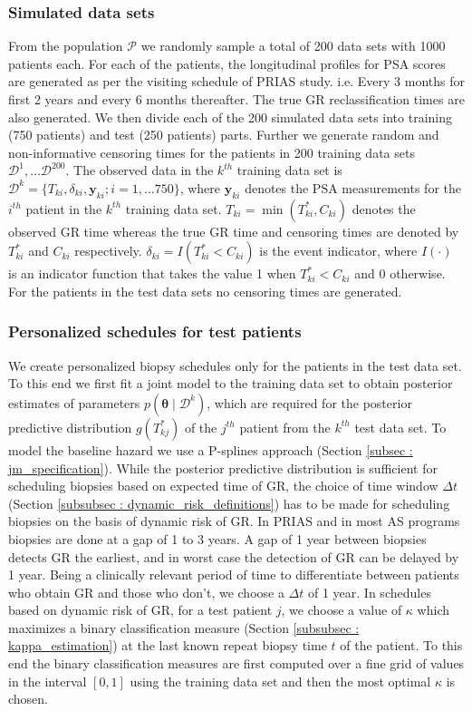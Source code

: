 \subsubsection{Simulated data sets}
From the population $\mathcal{P}$ we randomly sample a total of 200 data sets with 1000 patients each. For each of the patients, the longitudinal profiles for PSA scores are generated as per the visiting schedule of PRIAS study. i.e. Every 3 months for first 2 years and every 6 months thereafter. The true GR reclassification times are also generated. We then divide each of the 200 simulated data sets into training (750 patients) and test (250 patients) parts. Further we generate random and non-informative censoring times for the patients in 200 training data sets $\mathcal{D}^1, \ldots \mathcal{D}^{200}$. The observed data in the $k^{th}$ training data set is $\mathcal{D}^k = \{T_{ki}, \delta_{ki}, \boldsymbol{y}_{ki}; i = 1,\ldots 750\}$, where $\boldsymbol{y}_{ki}$ denotes the PSA measurements for the $i^{th}$ patient in the $k^{th}$ training data set. $T_{ki} = \min(T^*_{ki}, C_{ki})$ denotes the observed GR time whereas the true GR time and censoring times are denoted by $T^*_{ki}$ and $C_{ki}$ respectively. $\delta_{ki} = I(T^*_{ki} < C_{ki})$ is the event indicator, where $I(\cdot)$ is an indicator function that takes the value 1 when $T^*_{ki} < C_{ki}$ and 0 otherwise. For the patients in the test data sets no censoring times are generated.

\subsubsection{Personalized schedules for test patients}
We create personalized biopsy schedules only for the patients in the test data set. To this end we first fit a joint model to the training data set to obtain posterior estimates of parameters $p(\boldsymbol{\theta} \mid \mathcal{D}^k)$, which are required for the posterior predictive distribution $g(T^*_{kj})$ of the $j^{th}$ patient from the $k^{th}$ test data set. To model the baseline hazard we use a P-splines approach (Section \ref{subsec : jm_specification}).
While the posterior predictive distribution is sufficient for scheduling biopsies based on expected time of GR, the choice of time window $\Delta t$ (Section \ref{subsubsec : dynamic_risk_definitions}) has to be made for scheduling biopsies on the basis of dynamic risk of GR. In PRIAS and in most AS programs biopsies are done at a gap of 1 to 3 years. A gap of 1 year between biopsies detects GR the earliest, and in worst case the detection of GR can be delayed by 1 year. Being a clinically relevant period of time to differentiate between patients who obtain GR and those who don't, we choose a $\Delta t$ of 1 year. In schedules based on dynamic risk of GR, for a test patient $j$, we choose a value of $\kappa$ which maximizes a binary classification measure (Section \ref{subsubsec : kappa_estimation}) at the last known repeat biopsy time $t$ of the patient. To this end the binary classification measures are first computed over a fine grid of values in the interval $[0,1]$ using the training data set and then the most optimal $\kappa$ is chosen.\\

